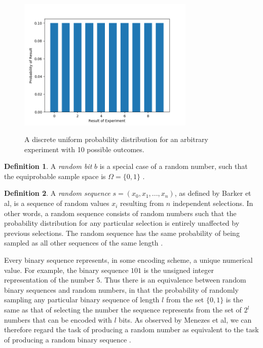 \documentclass[12pt, titlepage]{report}
\theoremstyle{definition}
\newtheorem{definition}{Definition}
\begin{document}
\begin{figure}
\centering
\includegraphics[width=0.75\textwidth]{img/uniform.png}\\
\caption[Discrete uniform distribution]{A discrete uniform probability distribution for an arbitrary experiment with 10 possible outcomes.}
\label{figure:uniform_distribution}
\end{figure}

\begin{definition}
A \emph{random bit} $b$ is a special case of a random number, such that the equiprobable sample space is $\Omega = \{0, 1\}$ \cite[s. 1.1.1]{rukhin2001statistical}.
\end{definition}

\begin{definition}
A \emph{random sequence} $s = (x_0, x_1, ..., x_n)$, as defined by Barker et al, is a sequence of random values $x_i$ resulting from $n$ independent selections. In other words, a random sequence consists of random numbers such that the probability distribution for any particular selection is entirely unaffected by previous selections. The random sequence has the same probability of being sampled as all other sequences of the same length \cite[p. 7]{barker2007recommendation} \cite[s. 1.1.1]{rukhin2001statistical}.
\end{definition}

Every binary sequence represents, in some encoding scheme, a unique numerical value. For example, the binary sequence $101$ is the unsigned integer representation of the number $5$. Thus there is an equivalence between random binary sequences and random numbers, in that the probability of randomly sampling any particular binary sequence of length $l$ from the set $\{0, 1\}$ is the same as that of selecting the number the sequence represents from the set of $2^l$ numbers that can be encoded with $l$ bits. As observed by Menezes et al, we can therefore regard the task of producing a random number as equivalent to the task of producing a random binary sequence \cite[p. 170]{menezes1996handbook}.
\end{document}
